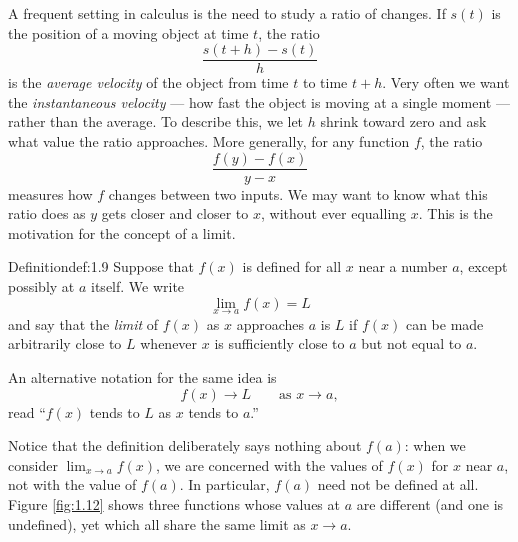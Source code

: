 \documentclass[a4paper,12pt,oneside]{memoir}
\begin{document}
A frequent setting in calculus is the need to study a ratio of changes. If \(s(t)\) is the position of a moving object at time \(t\), the ratio \[ \frac{s(t + h) - s(t)}{h} \] is the \emph{average velocity} of the object from time \(t\) to time \(t + h\). Very often we want the \emph{instantaneous velocity} — how fast the object is moving at a single moment — rather than the average. To describe this, we let \(h\) shrink toward zero and ask what value the ratio approaches. More generally, for any function \(f\), the ratio \[ \frac{f(y) - f(x)}{y - x} \] measures how \(f\) changes between two inputs. We may want to know what this ratio does as \(y\) gets closer and closer to \(x\), without ever equalling \(x\). This is the motivation for the concept of a limit.

\begin{envdefinition}{Definition}{def:1.9}{}
Suppose that \(f(x)\) is defined for all \(x\) near a number \(a\), except possibly at \(a\) itself. We write \[ \lim_{x \to a} f(x) = L \] and say that the \emph{limit} of \(f(x)\) as \(x\) approaches \(a\) is \(L\) if \(f(x)\) can be made arbitrarily close to \(L\) whenever \(x\) is sufficiently close to \(a\) but not equal to \(a\).
\end{envdefinition}
An alternative notation for the same idea is \[ f(x) \to L \qquad \text{as } x \to a, \] read “\(f(x)\) tends to \(L\) as \(x\) tends to \(a\).”

Notice that the definition deliberately says nothing about \(f(a)\): when we consider \(\lim_{x \to a} f(x)\), we are concerned with the values of \(f(x)\) for \(x\) near \(a\), not with the value of \(f(a)\). In particular, \(f(a)\) need not be defined at all. Figure \ref{fig:1.12} shows three functions whose values at \(a\) are different (and one is undefined), yet which all share the same limit as \(x \to a\).
\end{document}
